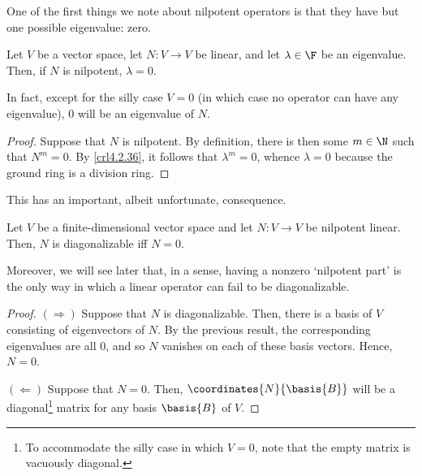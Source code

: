 One of the first things we note about nilpotent operators is that they have but one possible eigenvalue:  zero.
\begin{prp}{}{}
	Let $V$ be a vector space, let $N\colon V\rightarrow V$ be linear, and let $\lambda \in \F$ be an eigenvalue.  Then, if $N$ is nilpotent, $\lambda =0$.
	\begin{rmk}
		In fact, except for the silly case $V=0$ (in which case no operator can have any eigenvalue), $0$ will be an eigenvalue of $N$.
	\end{rmk}
	\begin{proof}
		Suppose that $N$ is nilpotent.  By definition, there is then some $m\in \N$ such that $N^m=0$.  By \cref{crl4.2.36}, it follows that $\lambda ^m=0$, whence $\lambda =0$ because the ground ring is a division ring.
	\end{proof}
\end{prp}
This has an important, albeit unfortunate, consequence.
\begin{crl}{}{}
	Let $V$ be a finite-dimensional vector space and let $N\colon V\rightarrow V$ be nilpotent linear.  Then, $N$ is diagonalizable iff $N=0$.
	\begin{rmk}
		Moreover, we will see later that, in a sense, having a nonzero `nilpotent part' is the only way in which a linear operator can fail to be diagonalizable.
	\end{rmk}
	\begin{proof}
		$(\Rightarrow )$ Suppose that $N$ is diagonalizable.  Then, there is a basis of $V$ consisting of eigenvectors of $N$.  By the previous result, the corresponding eigenvalues are all $0$, and so $N$ vanishes on each of these basis vectors.  Hence, $N=0$.
		
		\blni
		$(\Leftarrow )$ Suppose that $N=0$.  Then, $\coordinates{N}{\basis{B}}$ will be a diagonal\footnote{To accommodate the silly case in which $V=0$, note that the empty matrix is vacuously diagonal.} matrix for any basis $\basis{B}$ of $V$.
	\end{proof}
\end{crl}

